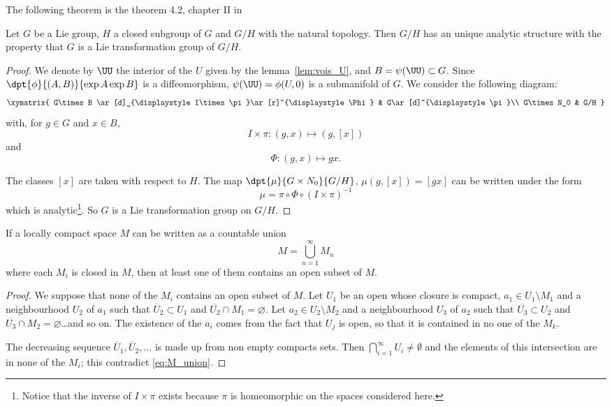 The following theorem is the theorem 4.2, chapter II in \cite{Helgason}
\begin{theorem}\label{Helgason4.2}\label{tho:struc_anal}
Let $G$ be a Lie group, $H$ a closed subgroup of $G$ and $G/H$ with the natural topology. Then $G/H$ has an unique analytic structure with the property that $G$ is a Lie transformation group of $G/H$.
\end{theorem}

\begin{proof}
We denote by $\UU$ the interior of the $U$ given by the lemma~\ref{lem:vois_U}, and $B=\psi(\UU)\subset G$. Since $\dpt{\phi}{(A,B)}{\exp A\exp B}$ is a diffeomorphism, $\psi(\UU)=\phi(U,0)$ is a submanifold of $G$. We consider the following diagram:
\[
\xymatrix{
    G\times B  \ar[d]_{\displaystyle I\times\pi}\ar[r]^{\displaystyle\Phi}    &
                                                                     G\ar[d]^{\displaystyle\pi}\\
    G\times N_0 &                                                             G/H
  }\]
with, for $g\in G$ and $x\in B$,
\[
I\times\pi\colon (g,x)\mapsto (g,[x])
\]
and
\[
\Phi\colon (g,x)\mapsto gx.
\]

\noindent The classes $[x]$ are taken with respect to $H$. The map $\dpt{\mu}{G\times N_0}{G/H}$, $\mu(g,[x])=[gx]$ can be written under the form
\[
   \mu=\pi\circ\Phi\circ(I\times\pi)^{-1}
\]
which is analytic\footnote{Notice that the inverse of $I\times\pi$ exists because $\pi$ is homeomorphic on the spaces considered here.}. So $G$ is a Lie transformation group on $G/H$.

\end{proof}


\begin{lemma} \label{lem:categ}
If a locally compact space $M$ can be written as a countable union
\begin{equation}\label{eq:M_union}
   M=\bigcup_{n=1}^{\infty}M_n
\end{equation}
where each $M_i$ is closed in $M$, then at least one of them contains an open subset of $M$.
\end{lemma}

\begin{proof}
We suppose that none of the $M_i$ contains an open subset of $M$. Let $U_1$ be an open whose closure is compact, $a_1\in U_1\setminus M_1$ and a neighbourhood $U_2$ of $a_1$ such that $\overline{U}_2\subset U_1$ and $\overline{U_2}\cap M_1=\varnothing$. Let $a_2\in U_2\setminus M_2$ and a neighbourhood $U_3$ of $a_2$ such that $\overline{U_3}\subset U_2$ and $\overline{U_3}\cap M_2=\varnothing$\ldots and so on. The existence of the $a_i$ comes from the fact that $U_j$ is open, so that it is contained in no one of the $M_k$.

The decreasing sequence $\overline{U}_1,\overline{U}_2 ,\ldots$ is made up from non empty compacts sets. Then $\bigcap_{i=1}^{\infty}U_i\neq\emptyset$ and the elements of this intersection are in none of the $M_i$; this contradict \eqref{eq:M_union}.
\end{proof}


